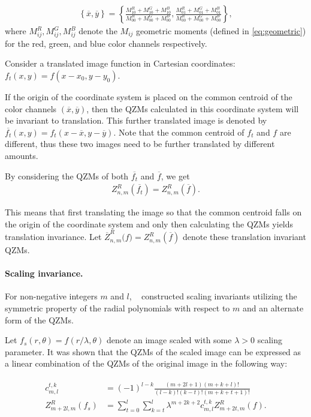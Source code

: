 \begin{gather*}
    \left\{\overline{x}, \overline{y}\right\} = \left\{\frac{M_{10}^R + M_{10}^G + M_{10}^B}{M_{00}^R + M_{00}^G + M_{00}^B}, \frac{M_{01}^R + M_{01}^G + M_{01}^B}{M_{00}^R + M_{00}^G + M_{00}^B} \right\},
\end{gather*}
where $M_{ij}^R, M_{ij}^G, M_{ij}^B$ denote the $M_{ij}$ geometric moments (defined in \eqref{eq:geometric}) for the red, green, and blue color channels respectively.


Consider a translated image function in Cartesian coordinates: $f_t(x,y) = f(x - x_0, y - y_0)$. 

If the origin of the coordinate system is placed on the common centroid of the color channels $(\overline{x}, \overline{y})$, then the QZMs calculated in this coordinate system will be invariant to translation. This further translated image is denoted by $\overline{f_t}(x,y) = f_t(x - \overline{x}, y - \overline{y})$. Note that the common centroid of $f_t$ and $f$ are different, thus these two images need to be further translated by different amounts.


By considering the QZMs of both $\overline{f_t}$ and $\overline{f}$, we get
\begin{gather*}
    {Z}_{n,m}^R\left(\overline{f_t}\right) = {Z}_{n,m}^R\left(\overline{f}\right).
\end{gather*}


This means that first translating the image so that the common centroid falls on the origin of the coordinate system and only then calculating the QZMs yields translation invariance. 
Let $\overline{Z}_{n,m}^R\big(f\big) = {Z}_{n,m}^R\left(\overline{f}\right)$ denote these translation invariant QZMs.

\paragraph{Scaling invariance.}
For non-negative integers $m$ and $l$, \citeauthor{qzmi}~\cite{qzmi} constructed scaling invariants utilizing the symmetric property of the radial polynomials with respect to $m$ and an alternate form of the QZMs.


Let $f_s(r,\theta) = f(r/\lambda, \theta)$ denote an image scaled with some $\lambda > 0$ scaling parameter. It was shown that the QZMs of the scaled image can be expressed as a linear combination of the QZMs of the original image in the following way:

\begin{gather*}
  \begin{split}
  c_{m,l}^{t,k} &= (-1)^{l-k}\frac{(m + 2l + 1)(m + k + l)!}{(l - k)!(k - t)!(m + k + t + 1)!} \\
  Z_{m + 2l,m}^R(f_s) &= \sum_{t=0}^l\sum_{k=t}^l\lambda^{m+2k+2}c_{m,l}^{t,k}Z_{m+2t,m}^R(f).
  \end{split}
\end{gather*}

